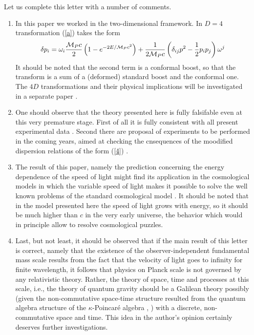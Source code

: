 \documentclass [11pt] {article}
\begin{document}
Let us complete this letter with a number of comments.
\begin{enumerate}
\item In this paper we worked in the two-dimensional framework. In
$D=4$ transformation (\ref{a}) takes the form $$\delta p_i =
\omega_{i}\frac{{\cal M}_P c}{2} \left( 1 - e^{-2 E/{\cal M}_P
 c^2}\right) +  \frac{1}{2{\cal M}_P c}\left(\delta_{ij} p^2
 - \frac12 p_ip_j\right)\omega^j$$ It should be noted that the second term
 is a conformal boost, so that the transform is a sum of a
 (deformed) standard boost and the conformal one. The $4D$
 transformations and their physical implications will be
 investigated in a separate paper \cite{RGJ}.
\item One should observe that the theory presented here is  fully
falsifable even at this very premature stage. First of all it is fully 
consistent with all present experimental data  \cite{grbgac}. Second there 
are proposal of experiments to be performed in the coming years, aimed at 
checking the cnsequences of the moodified dispersion relations of the form 
 (\ref{4}) \cite{glast}.
\item The result of this paper, namely the prediction concerning the 
energy dependence of the speed of light might find its application in the 
cosmological models in which the variable speed of light makes it possible 
to solve the well known problems of the standard cosmological model 
\cite{cosmo}. It should be noted that in the model presented here the speed  
of light grows with energy, so it should be much higher than $c$ in the 
very early universe, the behavior which would  in principle allow to 
resolve cosmological puzzles. 
\item Last, but not least, it should be observed that if the main
result of this letter is correct, namely that the existence of the 
observer-independent fundamental mass  scale results from the fact that the 
velocity of light goes to infinity for finite wavelength, it follows that 
physics on Planck scale is not governed by any relativistic theory. Rather, 
the theory of space, time and processes at this scale, i.e., the theory of 
quantum gravity should be a Galilean theory possibly (given the 
non-commutative space-time structure resulted from the quantum algebra 
structure of the $\kappa$-Poincar\'{e} algebra \cite{maru}, \cite{luruza}) with 
a discrete, non-commutative space and  time. This idea  in the author's 
opinion certainly deserves further investigations. 
\end{enumerate}
\end{document}
